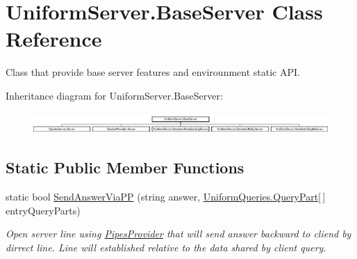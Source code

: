 \hypertarget{class_uniform_server_1_1_base_server}{}\section{Uniform\+Server.\+Base\+Server Class Reference}
\label{class_uniform_server_1_1_base_server}


Class that provide base server features and envirounment static A\+PI.  


Inheritance diagram for Uniform\+Server.\+Base\+Server\+:\begin{figure}[H]
\begin{center}
\leavevmode
\includegraphics[height=0.817518cm]{d7/d32/class_uniform_server_1_1_base_server}
\end{center}
\end{figure}
\subsection*{Static Public Member Functions}
\begin{DoxyCompactItemize}
\item 
static bool \mbox{\hyperlink{class_uniform_server_1_1_base_server_aefbb2a4287a7f995582b2abf41da8a89}{Send\+Answer\+Via\+PP}} (string answer, \mbox{\hyperlink{struct_uniform_queries_1_1_query_part}{Uniform\+Queries.\+Query\+Part}}\mbox{[}$\,$\mbox{]} entry\+Query\+Parts)
\begin{DoxyCompactList}\small\item\em Open server line using \mbox{\hyperlink{namespace_pipes_provider}{Pipes\+Provider}} that will send answer backward to cliend by dirrect line. Line will established relative to the data shared by client query. \end{DoxyCompactList}\end{DoxyCompactItemize}
